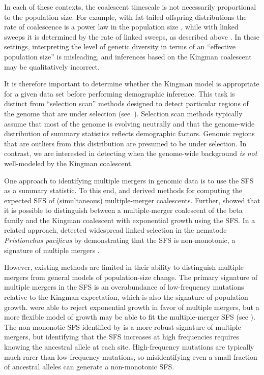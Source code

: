 \documentclass[11pt, letterpaper]{article}   	%
\begin{document}
In each of these contexts, the coalescent timescale is not necessarily proportional to the population size.
For example, with fat-tailed offspring distributions the rate of coalescence is a power law in the population size \autocite{Schweinsberg2003}, while with linked sweeps it is determined by the rate of linked sweeps, as described above \autocite{DurrettSchweinsberg2005}.
In these settings, interpreting the level of genetic diversity in terms of an ``effective population size'' is misleading, and inferences based on the Kingman coalescent may be qualitatively incorrect.

It is therefore important to determine whether the Kingman model is appropriate for a given data set before performing demographic inference.
This task is distinct from ``selection scan'' methods designed to detect particular regions of the genome that are under selection (see~\cite{VittiEtAl2013}).
Selection scan methods typically assume that most of the genome is evolving neutrally and that the genome-wide distribution of summary statistics reflects demographic factors.
Genomic regions that are outliers from this distribution are presumed to be under selection.
In contrast, we are interested in detecting when the genome-wide background \emph{is not} well-modeled by the Kingman coalescent.

One approach to identifying multiple mergers in genomic data is to use the SFS as a summary statistic.
To this end, \textcite{BirknerEtAl2013, BlathEtAl2016} and \textcite{SpenceEtAl2016} derived methods for computing the expected SFS of (simultaneous) multiple-merger coalescents.
Further, \textcite{EldonEtAl2015} showed that it is possible to distinguish between a multiple-merger coalescent of the beta family and the Kingman coalescent with exponential growth using the SFS.
In a related approach, \textcite{RodelspergerEtAl2014} detected widespread linked selection in the nematode \textit{Pristionchus pacificus} by demonstrating that the SFS is non-monotonic, a signature of multiple mergers \autocite{NeherHallatschek2013, BirknerEtAl2013}.

However, existing methods are limited in their ability to distinguish multiple mergers from general models of population-size change.
The primary signature of multiple mergers in the SFS is an overabundance of low-frequency mutations relative to the Kingman expectation, which is also the signature of population growth.
\textcite{EldonEtAl2015} were able to reject exponential growth in favor of multiple mergers, but a more flexible model of growth may be able to fit the multiple-merger SFS (see \cite{MyersEtAl2008, BhaskarSong2014}).
The non-mononotic SFS identified by \textcite{RodelspergerEtAl2014} is a more robust signature of multiple mergers, but identifying that the SFS increases at high frequencies requires knowing the ancestral allele at each site.
High-frequency mutations are typically much rarer than low-frequency mutations, so misidentifying even a small fraction of ancestral alleles can generate a non-monotonic SFS.
\end{document}
